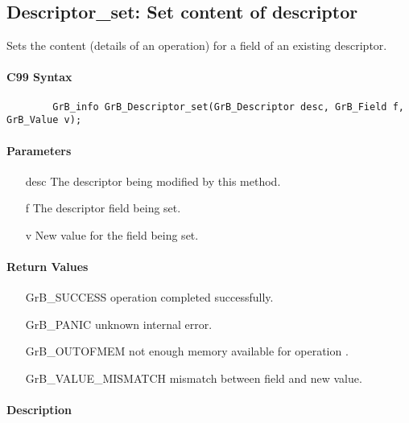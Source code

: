 \subsection{{\sf Descriptor\_set}: Set content of descriptor}

Sets the content (details of an operation) for a field of an existing
descriptor.

\paragraph{C99 Syntax}

\begin{verbatim}
        GrB_info GrB_Descriptor_set(GrB_Descriptor desc, GrB_Field f, GrB_Value v);
\end{verbatim}

\paragraph{Parameters}

\begin{itemize}[leftmargin=1.1in]
    \item[{\sf desc}] The descriptor being modified by this method.
    \item[{\sf f}] The descriptor field being set.
    \item[{\sf v}] New value for the field being set.
\end{itemize}

\paragraph{Return Values}

\begin{itemize}[leftmargin=2.1in]
\item[{\sf GrB\_SUCCESS}]           operation completed successfully.
\item[{\sf GrB\_PANIC}]             unknown internal error.
\item[{\sf GrB\_OUTOFMEM}]          not enough memory available for operation .
\item[{\sf GrB\_VALUE\_MISMATCH}]   mismatch between field and new value.
\end{itemize}

\paragraph{Description}

